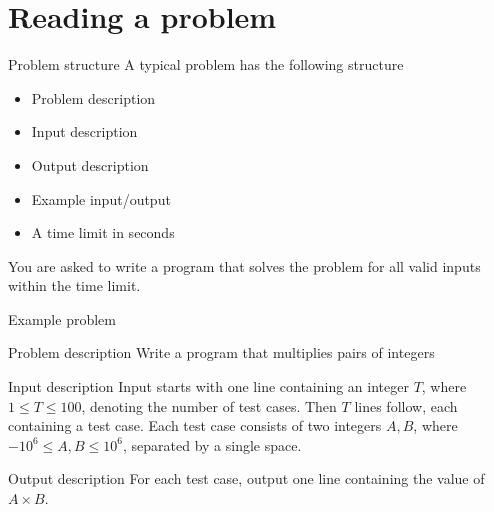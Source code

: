 \documentclass[11pt,pdf, aspectratio=169]{beamer}
\begin{document}
  \section{Reading a problem}
  \begin{frame}{Problem structure}
    A typical problem has the following structure
    \begin{itemize}
      \item Problem description
      \item Input description
      \item Output description
      \item Example input/output
      \item A time limit in seconds
    \end{itemize}
    You are asked to write a program that solves the problem for all valid inputs within the time limit.
  \end{frame}
  \begin{frame}{Example problem}
    \begin{block}{Problem description}
      Write a program that multiplies pairs of integers
    \end{block}
    \vspace{10pt}
    \begin{block}{Input description}
      Input starts with one line containing an integer $T$, where $1\leq T \leq 100$, denoting the number of test cases.
      Then $T$ lines follow, each containing a test case.
      Each test case consists of two integers $A,B$, where $-10^{6} \leq A,B \leq 10^{6}$, separated by a single space.
    \end{block}

    \vspace{10pt}

    \begin{block}{Output description}
      For each test case, output one line containing the value of $A\times B$.
    \end{block}
  \end{frame}
\end{document}
